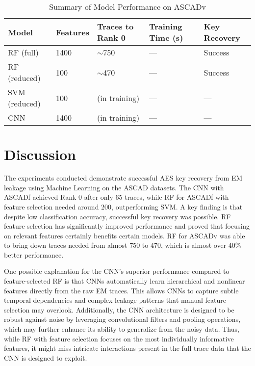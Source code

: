 \documentclass[runningheads]{llncs}
\begin{document}
\begin{table}[htbp]
    \centering
    \caption{Summary of Model Performance on ASCADv }
    \label{tab:model_comparison}
    \begin{tabular}{|p{2.5cm}|p{1.6cm}|p{2.2cm}|p{2cm}|p{2.6cm}|}
        \hline
        \textbf{Model} & \textbf{Features} & \textbf{Traces to Rank 0} & \textbf{Training Time (s)} & \textbf{Key Recovery} \\
        \hline
        RF (full) & 1400 & $\sim$750 & --- & Success \\
        \hline
        RF (reduced) & 100 & $\sim$470 & ---  & Success \\
        \hline
        SVM (reduced) & 100 & (in training) & --- & --- \\
        \hline
        CNN & 1400 & (in training) & ---  & --- \\
        \hline
    \end{tabular}
\end{table}
\section{Discussion}
The experiments conducted demonstrate successful AES key recovery from EM leakage using Machine Learning on the ASCAD datasets. The CNN with ASCADf achieved Rank 0 after only 65 traces, while RF for ASCADf with feature selection needed around 200, outperforming SVM. A key finding is that despite low classification accuracy, successful key recovery was possible. RF feature selection has significantly improved performance and proved that focusing on relevant features certainly benefits certain models. RF for ASCADv was able to bring down traces needed from almost 750 to 470, which is almost over 40\% better performance.

One possible explanation for the CNN's superior performance compared to feature-selected RF is that CNNs automatically learn hierarchical and nonlinear features directly from the raw EM traces. This allows CNNs to capture subtle temporal dependencies and complex leakage patterns that manual feature selection may overlook. Additionally, the CNN architecture is designed to be robust against noise by leveraging convolutional filters and pooling operations, which may further enhance its ability to generalize from the noisy data. Thus, while RF with feature selection focuses on the most individually informative features, it might miss intricate interactions present in the full trace data that the CNN is designed to exploit.
\end{document}
